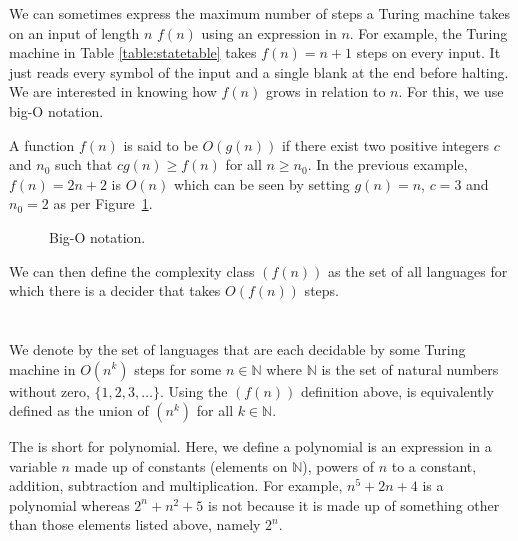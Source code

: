 \documentclass{iansnotes}
\begin{document}
  We can sometimes express the maximum number of steps a Turing machine takes on an input of length $n$ \( f(n) \) using an expression in $n$.
  For example, the Turing machine in Table \ref{table:statetable} takes \( f(n) = n + 1 \) steps on every input.
  It just reads every symbol of the input and a single blank at the end before halting.  
  We are interested in knowing how \( f(n) \) grows in relation to \( n \).
  For this, we use big-O notation.

  A function \( f(n) \) is said to be \( O(g(n)) \) if there exist two positive integers \( c \) and \( n_0 \) such that \( cg(n) \geq f(n) \) for all \(n \geq n_0 \).
  In the previous example, \( f(n) = 2n + 2 \) is \( O(n) \) which can be seen by setting \( g(n) = n \), \( c = 3 \) and \( n_0 = 2 \) as per Figure~\ref{figure:bigo}.
  \begin{figure}
  \caption{Big-O notation.}
  \label{figure:bigo}
\end{figure}
  We can then define the complexity class \((f(n)) \) as the set of all languages for which there is a decider that takes \( O\left(f(n)\right) \) steps.

\section{}
  We denote by  the set of languages that are each decidable by some Turing machine in \( O(n^k) \) steps for some \( n \in \mathbb{N} \) where \( \mathbb{N} \) is the set of natural numbers without zero, \( \{ 1, 2, 3, \ldots\} \).
  Using the \((f(n)) \) definition above,  is equivalently defined as the union of \((n^k)\) for all \( k \in \mathbb{N} \).
  
  The  is short for polynomial.
  Here, we define a polynomial is an expression in a variable \( n \) made up of constants (elements on \( \mathbb{N}\)), powers of \( n \) to a constant, addition, subtraction and multiplication.
  For example, \( n^5 + 2n + 4 \) is a polynomial whereas \( 2^n + n^2 + 5 \) is not because it is made up of something other than those elements listed above, namely \( 2^n \).
\end{document}
